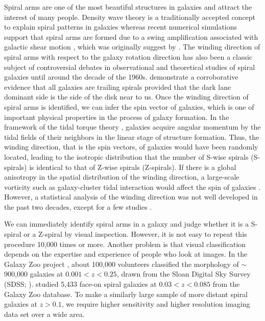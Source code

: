 \documentclass[a4paper,fleqn,usenatbib]{mnras}
\begin{document}
Spiral arms are one of the most beautiful structures in galaxies and attract the interest of many people.
Density wave theory is a traditionally accepted concept to explain spiral patterns in galaxies \citep{1964ApJ...140..646L} whereas recent numerical simulations support that spiral arms are formed due to a swing amplification associated with galactic shear motion \citep[e.g.,][]{2013ApJ...763...46B, 2014PASA...31...35D}, which was originally suggest by \cite{1965MNRAS.130..125G}.
The winding direction of spiral arms with respect to the galaxy rotation direction has also been a classic subject of controversial debates in observational and theoretical studies of spiral galaxies until around the decade of the 1960s.   
\cite{2019ApJ...886..133I} demonstrate a corroborative evidence that all galaxies are trailing spirals provided that the dark lane dominant side is the side of the disk near to us.
Once the winding direction of spiral arms is identified, we can infer the spin vector of galaxies, which is one of important physical properties in the process of galaxy formation.
In the framework of the tidal torque theory \citep[e.g.,][]{1970Ap......6..320D,1969ApJ...155..393P,1984ApJ...286...38W}, galaxies acquire angular momentum by the tidal fields of their neighbors in the linear stage of structure formation. 
Thus, the winding direction, that is the spin vectors, of galaxies would have been randomly located, leading to the isotropic distribution that the number of S-wise spirals (S-spirals) is identical to that of Z-wise spirals (Z-spirals).
If there is a global anisotropy in the spatial distribution of the winding direction, a large-scale vorticity such as galaxy-cluster tidal interaction would affect the spin of galaxies \citep{1995MNRAS.276..327S}.
However, a statistical analysis of the winding direction was not well developed in the past two decades, except for a few studies \citep{2017MNRAS.466.3928H,2017PASA...34...44S}.

We can immediately identify spiral arms in a galaxy and judge whether it is a S-spiral or a Z-spiral by visual inspection.
However, it is not easy to repeat this procedure 10,000 times or more.
Another problem is that visual classification depends on the expertise and experience of people who look at images.
In the Galaxy Zoo project \citep{2011MNRAS.410..166L,2013MNRAS.435.2835W}, about 100,000 volunteers classified the morphology of $\sim$900,000 galaxies at $0.001<z<0.25$, drawn from the Sloan Digital Sky Survey (SDSS; \citealt{2000AJ....120.1579Y}).
\cite{2010MNRAS.405..783M} studied 5,433 face-on spiral galaxies at $0.03<z<0.085$ from the Galaxy Zoo database.
To make a similarly large sample of more distant spiral galaxies at $z>0.1$, we require higher sensitivity and higher resolution imaging data set over a wide area.
\end{document}
